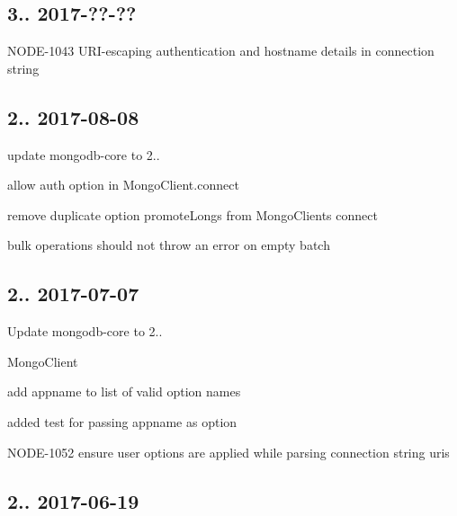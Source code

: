 \subsection*{3.. 2017-\/??-\/?? }


\begin{DoxyItemize}
\item N\+O\+D\+E-\/1043 U\+R\+I-\/escaping authentication and hostname details in connection string
\end{DoxyItemize}

\subsection*{2.. 2017-\/08-\/08 }


\begin{DoxyItemize}
\item update mongodb-\/core to 2..
\item allow auth option in Mongo\+Client.\+connect
\item remove duplicate option {\ttfamily promote\+Longs} from Mongo\+Client\textquotesingle{}s {\ttfamily connect}
\item bulk operations should not throw an error on empty batch
\end{DoxyItemize}

\subsection*{2.. 2017-\/07-\/07 }


\begin{DoxyItemize}
\item Update mongodb-\/core to 2..
\item Mongo\+Client
\begin{DoxyItemize}
\item add {\ttfamily appname} to list of valid option names
\item added test for passing appname as option
\end{DoxyItemize}
\item N\+O\+D\+E-\/1052 ensure user options are applied while parsing connection string uris
\end{DoxyItemize}

\subsection*{2.. 2017-\/06-\/19 }


